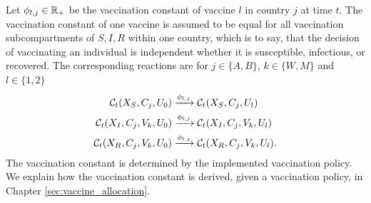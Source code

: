 Let $\phi_{l,j} \in \mathbb{R}_+$ be the vaccination constant of vaccine $l$ in country $j$ at time $t$. The vaccination constant of one vaccine is assumed to be equal for all vaccination subcompartments of $S, I,R$ within one country, which is to say, that the decision of vaccinating an individual is independent whether it is susceptible, infectious, or recovered.  The corresponding reactions are for $j \in \{A,B\}$, $k \in \{W,M\}$ and $l \in \{1,2\}$
\begin{align}
\mathcal{C}_t(X_S, C_j, U_0) &\xrightarrow{\phi_{l, j}} \mathcal{C}_t(X_S, C_j, U_l)  \\
\mathcal{C}_t(X_I, C_j, V_k, U_0) &\xrightarrow{\phi_{l,j}} \mathcal{C}_t(X_I, C_j, V_k, U_l) \notag \\
\mathcal{C}_t(X_R, C_j, V_k, U_0) &\xrightarrow{\phi_{l,j}} \mathcal{C}_t(X_R, C_j, V_k, U_l). \notag
\end{align}
The vaccination constant is determined by the implemented vaccination policy. We explain how the vaccination constant is derived, given a vaccination policy, in Chapter \ref{sec:vaccine_allocation}.


